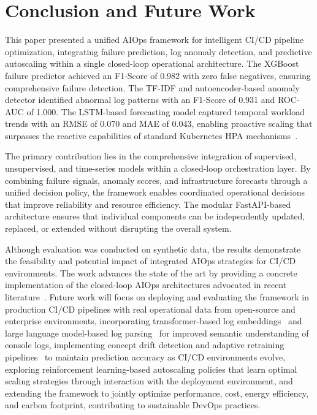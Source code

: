 \documentclass[sn-nature]{sn-jnl}
\theoremstyle{thmstyleone}
\theoremstyle{thmstyletwo}
\theoremstyle{thmstylethree}
\begin{document}
\section{Conclusion and Future Work}\label{sec:conclusion}

This paper presented a unified AIOps framework for intelligent CI/CD pipeline optimization, integrating failure prediction, log anomaly detection, and predictive autoscaling within a single closed-loop operational architecture.
The XGBoost failure predictor achieved an F1-Score of 0.982 with zero false negatives, ensuring comprehensive failure detection.
The TF-IDF and autoencoder-based anomaly detector identified abnormal log patterns with an F1-Score of 0.931 and ROC-AUC of 1.000.
The LSTM-based forecasting model captured temporal workload trends with an RMSE of 0.070 and MAE of 0.043, enabling proactive scaling that surpasses the reactive capabilities of standard Kubernetes HPA mechanisms~\cite{kubernetesDocs}.

The primary contribution lies in the comprehensive integration of supervised, unsupervised, and time-series models within a closed-loop orchestration layer.
By combining failure signals, anomaly scores, and infrastructure forecasts through a unified decision policy, the framework enables coordinated operational decisions that improve reliability and resource efficiency.
The modular FastAPI-based architecture ensures that individual components can be independently updated, replaced, or extended without disrupting the overall system.

Although evaluation was conducted on synthetic data, the results demonstrate the feasibility and potential impact of integrated AIOps strategies for CI/CD environments.
The work advances the state of the art by providing a concrete implementation of the closed-loop AIOps architectures advocated in recent literature~\cite{dang2019aiops, notaro2021aiops, zota2025agentic}.
Future work will focus on deploying and evaluating the framework in production CI/CD pipelines with real operational data from open-source and enterprise environments, incorporating transformer-based log embeddings~\cite{liao2025logtransformer, devlin2019bert} and large language model-based log parsing~\cite{zhou2024logllm} for improved semantic understanding of console logs, implementing concept drift detection and adaptive retraining pipelines~\cite{bayram2025trustworthy, abdullahi2025conceptdrift} to maintain prediction accuracy as CI/CD environments evolve, exploring reinforcement learning-based autoscaling policies that learn optimal scaling strategies through interaction with the deployment environment, and extending the framework to jointly optimize performance, cost, energy efficiency, and carbon footprint, contributing to sustainable DevOps practices.
\end{document}
